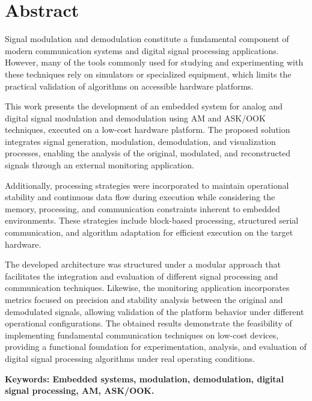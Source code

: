 \chapter*{Abstract}
\thispagestyle{empty}

Signal modulation and demodulation constitute a fundamental component of modern communication systems and digital signal processing applications. However, many of the tools commonly used for studying and experimenting with these techniques rely on simulators or specialized equipment, which limits the practical validation of algorithms on accessible hardware platforms.

This work presents the development of an embedded system for analog and digital signal modulation and demodulation using AM and ASK/OOK techniques, executed on a low-cost hardware platform. The proposed solution integrates signal generation, modulation, demodulation, and visualization processes, enabling the analysis of the original, modulated, and reconstructed signals through an external monitoring application.

Additionally, processing strategies were incorporated to maintain operational stability and continuous data flow during execution while considering the memory, processing, and communication constraints inherent to embedded environments. These strategies include block-based processing, structured serial communication, and algorithm adaptation for efficient execution on the target hardware.

The developed architecture was structured under a modular approach that facilitates the integration and evaluation of different signal processing and communication techniques. Likewise, the monitoring application incorporates metrics focused on precision and stability analysis between the original and demodulated signals, allowing validation of the platform behavior under different operational configurations. The obtained results demonstrate the feasibility of implementing fundamental communication techniques on low-cost devices, providing a functional foundation for experimentation, analysis, and evaluation of digital signal processing algorithms under real operating conditions.

\bigskip

\textbf{Keywords: Embedded systems, modulation, demodulation, digital signal processing, AM, ASK/OOK.} %

\cleardoublepage

